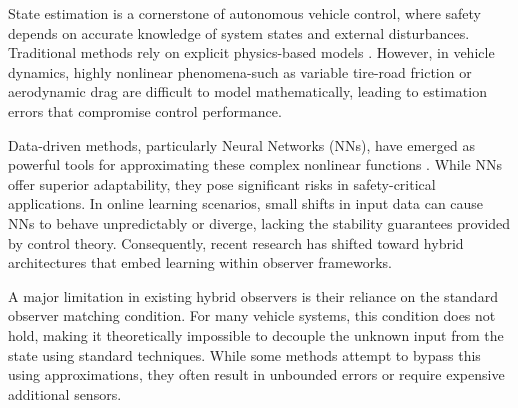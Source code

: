 \documentclass{ifacconf}
\begin{document}
State estimation is a cornerstone of autonomous vehicle control, where safety depends on accurate knowledge of system states and external disturbances. Traditional methods rely on explicit physics-based models \citep{State_Esti2017}. However, in vehicle dynamics, highly nonlinear phenomena-such as variable tire-road friction or aerodynamic drag are difficult to model mathematically, leading to estimation errors that compromise control performance.

Data-driven methods, particularly Neural Networks (NNs), have emerged as powerful tools for approximating these complex nonlinear functions \citep{2006Apdat, HO_GP}. While NNs offer superior adaptability, they pose significant risks in safety-critical applications. In online learning scenarios, small shifts in input data can cause NNs to behave unpredictably or diverge, lacking the stability guarantees provided by control theory. Consequently, recent research has shifted toward hybrid architectures that embed learning within observer frameworks.

A major limitation in existing hybrid observers is their reliance on the standard observer matching condition. For many vehicle systems, this condition does not hold, making it theoretically impossible to decouple the unknown input from the state using standard techniques. While some methods attempt to bypass this using approximations, they often result in unbounded errors or require expensive additional sensors.
\end{document}
